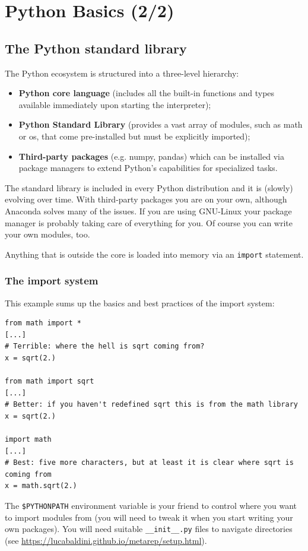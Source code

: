 \section{Python Basics (2/2)}

\subsection{The Python standard library}

The Python ecosystem is structured into a three-level hierarchy:
\begin{itemize}
    \item[-] \textbf{Python core language} (includes all the built-in functions and types available immediately upon starting the interpreter);
    \item[-] \textbf{Python Standard Library} (provides a vast array of modules, such as math or os, that come pre-installed but must be explicitly imported);
    \item[-] \textbf{Third-party packages} (e.g. numpy, pandas) which can be installed via package managers to extend Python's capabilities for specialized tasks.
\end{itemize}
The standard library is included in every Python distribution and it is (slowly) evolving over time. With third-party packages you are on your own, although Anaconda solves many of the issues. If you are using GNU-Linux your package manager is probably taking care of everything for you. Of course you can write your own modules, too.

Anything that is outside the core is loaded into memory via an \texttt{import} statement.

\subsubsection{The import system}
This example sums up the basics and best practices of the import system:

\begin{verbatim}
from math import *
[...]
# Terrible: where the hell is sqrt coming from?
x = sqrt(2.)

from math import sqrt
[...]
# Better: if you haven't redefined sqrt this is from the math library
x = sqrt(2.)

import math
[...]
# Best: five more characters, but at least it is clear where sqrt is coming from
x = math.sqrt(2.)
\end{verbatim}

The \texttt{\$PYTHONPATH} environment variable is your friend to control where you want to import modules from (you will need to tweak it when you start writing your own packages). You will need suitable \texttt{\_\_init\_\_.py} files to navigate directories (see \url{https://lucabaldini.github.io/metarep/setup.html}).

